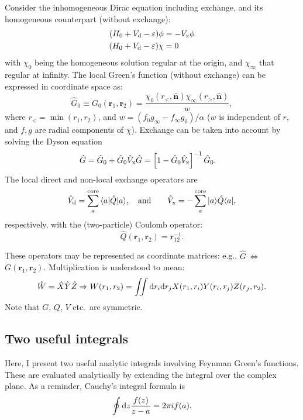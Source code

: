 \documentclass[10pt,twocolumn,a4paper]{article}%
\newcommand{\bra}[1]{\ensuremath{\langle #1|}}	%
\newcommand{\ket}[1]{\ensuremath{|#1\rangle}}	%
\renewcommand{\v}[1]{\ensuremath{\boldsymbol{#1}}}		%
\newcommand{\vhat}[1]{\ensuremath{\hat{\boldsymbol{#1}}}}		%
\newcommand{\be}{\begin{equation}}
\newcommand{\ee}{\end{equation}}
\def\d{\ensuremath{{\rm d}}}
\def\en{\ensuremath{\varepsilon}}
\begin{document}
Consider the inhomogeneous Dirac equation including exchange, and its homogeneous counterpart (without exchange):
\begin{align}
(H_0 + V_{\rm d} - \en)\phi &= -V_{\rm x}\phi \\
(H_0 + V_{\rm d} - \en)\chi &= 0
\end{align}
with $\chi_0$ being the homogeneous solution regular at the origin, and $\chi_\infty$ that regular at infinity.
The local Green's function (without exchange) can be expressed in coordinate space as:
\be
\hat G_0 \equiv  G_0(\v{r}_1,\v{r}_2) = \frac{\chi_0(r_<,\vhat{n})\chi_\infty(r_>,\vhat{n})}{w},
\label{eq:Green-direct}
\ee
where $r_<=\min(r_1,r_2)$, and $w=(f_0 g_\infty - f_\infty g_0)/\alpha$ ($w$ is independent of $r$, and $f,g$ are radial components of $\chi$).
Exchange can be taken into account by solving the Dyson equation~\cite{DzubaCPM1989plaEn,Abrikosov1965}
\begin{align}
\hat G &= \hat G_0 +  \hat G_0 \hat V_{\rm x}  \hat G = \left[ 1-  \hat G_0 \hat V_{\rm x}\right]^{-1}\hat G_0 .
\label{eq:Green-exchange}
\end{align}
The local direct and non-local exchange operators are
\begin{align}
\hat V_{\rm d} =  \sum_a^{\rm core}{\bra{a}\hat Q\ket{a}},
\quad\text{and}\qquad
\hat V_{\rm x} = - \sum_a^{\rm core}{\ket{a}\hat Q\bra{a}},
\end{align}
respectively, with the (two-particle) Coulomb operator:
\be\label{eq:CoulombOperator}
\hat Q(\v{r}_1,\v{r}_2) = \v{r}^{-1}_{12}.
\ee

These operators may be represented as coordinate matrices: e.g., $\hat G$\,$\Leftrightarrow$\,$G(\v{r}_1,\v{r}_2)$.
Multiplication is understood to mean:
 \[
 \hat W = \hat X \hat Y \hat Z \Rightarrow W(r_1, r_2) =  \iint \d r_i \d r_j X(r_1, r_i) Y(r_i, r_j) Z(r_j, r_2).
 \]
Note that $G$, $Q$, $V$ etc.\ are symmetric.

\subsection{Two useful integrals}

Here, I present two useful analytic integrals involving Feynman Green's functions.
These are evaluated analytically by extending the integral over the complex plane.
As a reminder, Cauchy's integral formula is
\[
\oint \d z \frac{f(z)}{z-a} = 2\pi i f(a).
\]
\end{document}
